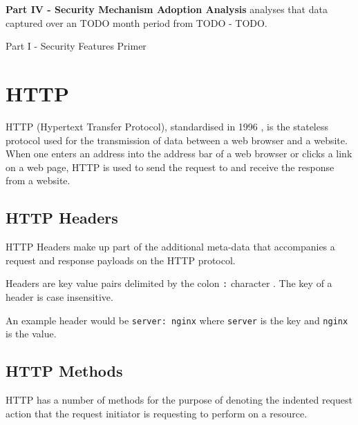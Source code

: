 \documentclass{mscreport}
\begin{document}
\vspace{0.3cm} \noindent
\textbf{Part IV - Security Mechanism Adoption Analysis} analyses that data captured over an TODO month period from TODO - TODO.

\newpage

\vspace*{\fill}
\begin{center}
\begin{huge}
Part I - Security Features Primer
\end{huge}
\end{center}
\vspace{\fill}

\newpage

\section{HTTP}
\label{section:http}

HTTP (Hypertext Transfer Protocol), standardised in 1996 \cite{Berners-Lee1996-ji}, is the stateless protocol used for the transmission of data between a web browser and a website. When one enters an address into the address bar of a web browser or clicks a link on a web page, HTTP is used to send the request to and receive the response from a website.

\subsection{HTTP Headers}

\noindent HTTP Headers make up part of the additional meta-data that accompanies a request and response payloads on the HTTP protocol.

\vspace{0.3cm} \noindent
Headers are key value pairs delimited by the colon \texttt{:} character \cite{Berners-Lee1996-ji}. The key of a header is case insensitive.

\vspace{0.3cm} \noindent
An example header would be \texttt{server: nginx} where \texttt{server} is the key and \texttt{nginx} is the value.

\subsection{HTTP Methods}

\noindent HTTP has a number of methods for the purpose of denoting the indented request action that the request initiator is requesting to perform on a resource.
\end{document}
